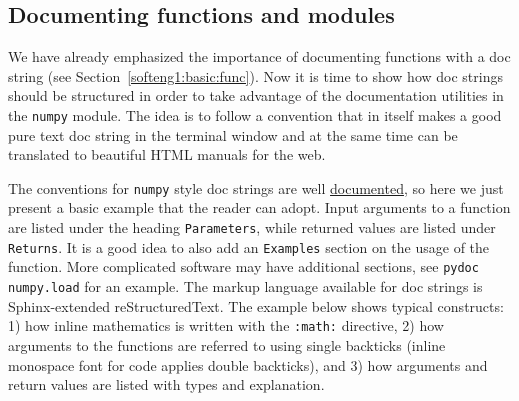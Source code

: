 \documentclass[graybox,sectrefs,envcountresetchap,open=right,final]{svmonodo}
\begin{document}
\subsection{Documenting functions and modules}
\label{softeng1:basic:docstring}

We have already emphasized the importance of documenting functions with
a doc string (see Section~\ref{softeng1:basic:func}). Now it is time
to show how doc strings should be structured in order to take advantage
of the documentation utilities in the \texttt{numpy} module. The idea is
to follow a convention that in itself makes a good pure text doc string
in the terminal window
and at the same time can be translated to beautiful HTML manuals for
the web.

The conventions for \texttt{numpy} style doc strings are well
\href{{https://github.com/numpy/numpy/blob/master/doc/HOWTO_DOCUMENT.rst.txt}}{documented}, so here we just present a basic example that the reader can adopt.
Input arguments to a function are listed under the heading \texttt{Parameters},
while returned values are listed under \texttt{Returns}. It is a good idea to
also add an \texttt{Examples} section on the usage of the function.
More complicated software may have additional sections, see \texttt{pydoc numpy.load}
for an example. The markup language available for doc strings is
Sphinx-extended reStructuredText. The example below shows typical
constructs: 1) how inline
mathematics is written with the \texttt{:math:} directive, 2) how arguments
to the functions are referred to using single backticks
(inline monospace font for code applies double backticks), and 3) how
arguments and return values are listed with types and explanation.
\end{document}
